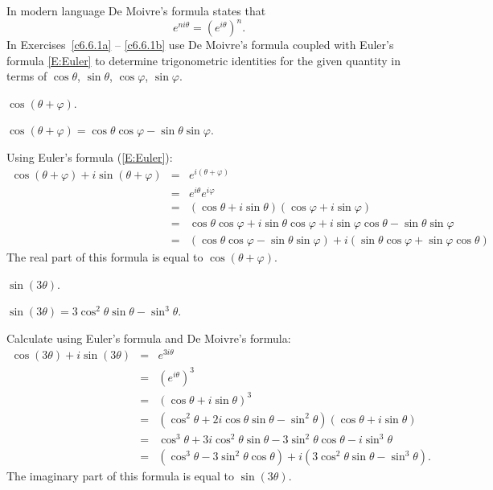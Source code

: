\documentclass{ximera}
\begin{document}
 In modern language De Moivre's formula states that
\[
e^{ni\theta} = \left(e^{i\theta}\right)^n.
\]
In Exercises~\ref{c6.6.1a} -- \ref{c6.6.1b} use De Moivre's formula coupled
with Euler's formula \eqref{E:Euler} to determine trigonometric identities
for the given quantity in terms of $\cos\theta$, $\sin\theta$, $\cos\varphi$,
$\sin\varphi$.
\begin{exercise}  \label{c6.6.1a}
$\cos(\theta+\varphi)$.

\begin{solution}

\ans $\cos(\theta + \varphi) = \cos\theta\cos\varphi -
\sin\theta\sin\varphi$.

\soln Using Euler's formula (\eqref{E:Euler}):
\[
\begin{array}{rcl}
\cos(\theta + \varphi) + i\sin(\theta + \varphi)
& = & e^{i(\theta + \varphi)} \\
& = & e^{i\theta}e^{i\varphi} \\
& = & (\cos\theta + i\sin\theta)(\cos\varphi + i\sin\varphi) \\
& = & \cos\theta\cos\varphi + i\sin\theta\cos\varphi +
i\sin\varphi\cos\theta - \sin\theta\sin\varphi \\
& = & (\cos\theta\cos\varphi - \sin\theta\sin\varphi) +
i(\sin\theta\cos\varphi + \sin\varphi\cos\theta)
\end{array}
\]
The real part of this formula is equal to $\cos(\theta + \varphi)$.

\end{solution}
\end{exercise}
\begin{exercise}  \label{c6.6.1b}
$\sin(3\theta)$.

\begin{solution}

\ans $\sin(3\theta) = 3\cos^2\theta\sin\theta - \sin^3\theta$.

\soln Calculate using Euler's formula and De Moivre's formula:
\[
\begin{array}{rcl}
\cos(3\theta) + i\sin(3\theta)
& = & e^{3i\theta} \\
& = & (e^{i\theta})^3 \\
& = & (\cos\theta + i\sin\theta)^3 \\
& = & (\cos^2\theta + 2i\cos\theta\sin\theta - \sin^2\theta)
(\cos\theta + i\sin\theta) \\
& = & \cos^3\theta + 3i\cos^2\theta\sin\theta -
3\sin^2\theta\cos\theta - i\sin^3\theta \\
& = & (\cos^3\theta - 3\sin^2\theta\cos\theta) +
i(3\cos^2\theta\sin\theta - \sin^3\theta).
\end{array}
\]
The imaginary part of this formula is equal to $\sin(3\theta)$.

\end{solution}
\end{exercise}
\end{document}
